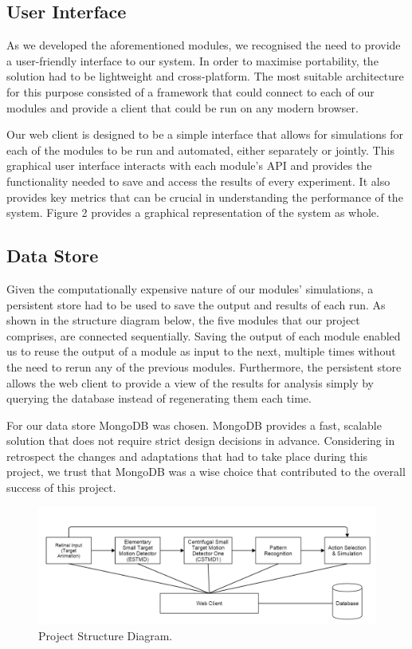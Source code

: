 \documentclass[a4paper,11pt]{article}
\begin{document}
\subsection{User Interface}
As we developed the aforementioned modules, we recognised the need to provide a user-friendly interface to our system. In order to maximise portability, the solution had to be lightweight and cross-platform. The most suitable architecture for this purpose consisted of a framework that could connect to each of our modules and provide a client that could be run on any modern browser.

Our web client is designed to be a simple interface that allows for simulations for each of the modules to be run and automated, either separately or jointly. This graphical user interface interacts with each module's API and provides the functionality needed to save and access the results of every experiment. It also provides key metrics that can be crucial in understanding the performance of the system. Figure 2 provides a graphical representation of the system as whole. 

\subsection{Data Store}

Given the computationally expensive nature of our modules' simulations, a persistent store had to be used to save the output and results of each run. As shown in the structure diagram below, the five modules that our project comprises, are connected sequentially. Saving the output of each module enabled us to reuse the output of a module as input to the next, multiple times without the need to rerun any of the previous modules. Furthermore, the persistent store allows the web client to provide a view of the results for analysis simply by querying the database instead of regenerating them each time.

For our data store MongoDB \cite{mdb} was chosen. MongoDB provides a fast, scalable solution that does not require strict design decisions in advance. Considering in retrospect the changes and adaptations that had to take place during this project, we trust that MongoDB was a wise choice that contributed to the overall success of this project.

\begin{figure}[h]
\centering
\includegraphics[scale = 0.35]{designblockdiagram2}
\caption{Project Structure Diagram.}
\end{figure}
\end{document}
